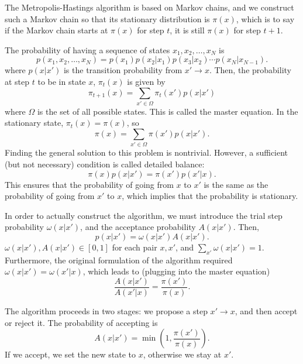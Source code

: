 The Metropolis-Hastings algorithm is based on Markov chains, and we construct such a Markov chain so that its stationary distribution is $\pi(x)$, which is to say if the Markov chain starts at $\pi(x)$ for step $t$, it is still $\pi(x)$ for step $t+1$.

The probability of having a sequence of states $x_1,x_2,\ldots,x_N$ is
\begin{equation}
    p(x_1,x_2,\ldots,x_N) = p(x_1)p(x_2|x_1)p(x_3|x_2)\cdots p(x_N|x_{N-1}).
\end{equation}
where $p(x|x')$ is the transition probability from $x'\to x$. Then, the probability at step $t$ to be in state $x$, $\pi_t(x)$ is given by
\begin{equation}
\pi_{t+1}(x) = \sum_{x'\in \Omega} \pi_t(x')p(x|x')
\end{equation}
where $\Omega$ is the set of all possible states. This is called the master equation. In the stationary state, $\pi_t(x)=\pi(x)$, so
\begin{equation}
    \pi(x) = \sum_{x'\in \Omega} \pi(x')p(x|x').
\end{equation}
Finding the general solution to this problem is nontrivial. However, a sufficient (but not necessary) condition is called detailed balance:
\begin{equation}
    \pi(x)p(x|x') = \pi(x')p(x'|x).
\end{equation}
This ensures that the probability of going from $x$ to $x'$ is the same as the probability of going from $x'$ to $x$, which implies that the probability is stationary.

In order to actually construct the algorithm, we must introduce the trial step probability $\omega(x|x')$, and the acceptance probability $A(x|x')$. Then,
\begin{equation}
    p(x|x') = \omega(x|x')A(x|x').
\end{equation}
$\omega(x|x'),A(x|x')\in [0,1]$ for each pair $x,x'$, and $\sum_{x'}\omega(x|x') = 1$. Furthermore, the original formulation of the algorithm required $\omega(x|x') = \omega(x'|x)$, which leads to (plugging into the master equation)
\begin{equation}
    \frac{A(x|x')}{A(x'|x)} = \frac{\pi(x')}{\pi(x)}.
\end{equation}

The algorithm proceeds in two stages: we propose a step $x'\to x$, and then accept or reject it. The probability of accepting is
\begin{equation}
    A(x|x') = \min\left(1,\frac{\pi(x')}{\pi(x)}\right).
\end{equation}
If we accept, we set the new state to $x$, otherwise we stay at $x'$.

